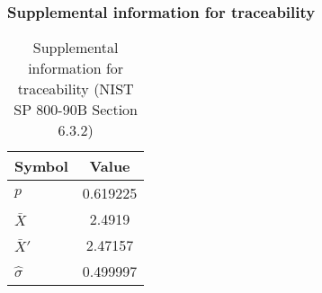 \documentclass[a3paper,xelatex,english]{bxjsarticle}
\begin{document}
\subsubsection{Supplemental information for traceability}
\renewcommand{\arraystretch}{1.8}
\begin{table}[h]
\caption{Supplemental information for traceability (NIST SP 800-90B Section 6.3.2)}
\begin{center}
\begin{tabular}{|l|c|}
\hline 
\rowcolor{anotherlightblue} %
Symbol				& Value \\ \hline 
$p$				& 0.619225\\ \hline 
$\bar{X}$ 		&   2.4919\\ \hline
$\bar{X}'$		&  2.47157\\ \hline
$\hat{\sigma}$		& 0.499997\\ \hline
\end{tabular}
\end{center}
\end{table}
\renewcommand{\arraystretch}{1.4}
\clearpage
\end{document}
